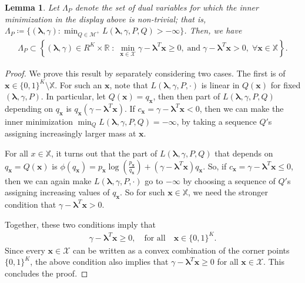 \documentclass{article}
\theoremstyle{plain}
\newtheorem{lemma}[lemma]{Lemma}
\theoremstyle{definition}
\newcommand{\lrp}[1]{\left( #1 \right)}
\newcommand{\R}{\mathbb{R}}
\newcommand{\calX}{\mathcal X}
\newcommand{\calM}{\mathcal M}
\newcommand{\xvec}{\mathbf{x}}
\newcommand{\qtext}[1]{\quad \text{#1} \quad}
\newcommand{\boldlambda}{\boldsymbol{\lambda}}
\newcommand{\finitesupport}{\mathbb{X}}
\begin{document}
\begin{lemma}
    \label{lemma:finite-dual-support}
    Let $\Lambda_P$ denote the set of dual variables for which the inner minimization in the display above is non-trivial; that is, $\Lambda_P \coloneqq \{(\boldlambda, \gamma): \min_{Q \in \calM^+} L(\boldlambda, \gamma, P, Q) > -\infty\}$. Then, we have 
\begin{align}
    \Lambda_P \subset \left\{ (\boldlambda, \gamma) \in R^K \times \R \;:\;  \min_{\xvec \in \calX}   \gamma -  \boldlambda^T \xvec \geq 0,  \;\text{and}\; \gamma - \boldlambda^T \xvec >0, \;\forall \xvec \in \finitesupport  \right\}. \label{eq:dual-feasible-1}
\end{align}
\end{lemma}

\begin{proof}
We prove this result by separately considering two cases. The first is of $\xvec \in \{0,1\}^K \setminus \finitesupport$. For such an $\xvec$, note that $L(\boldlambda, \gamma, P, \cdot)$ is linear in $Q(\xvec)$ for  fixed $(\boldlambda, \gamma, P)$.  In particular, let $Q(\xvec) = q_\xvec$, then then part of $L(\boldlambda, \gamma, P, Q)$ depending on $q_\xvec$ is $q_\xvec(\gamma - \boldlambda^T \xvec)$. If $c_\xvec = \gamma - \boldlambda^T \xvec < 0$, then we can make the inner minimization $\min_{Q} L(\boldlambda, \gamma, P, Q) = -\infty$, by taking a sequence $Q'$s assigning increasingly larger mass at $\xvec$. 

For all $x\in \finitesupport$, it turns out that the part of $L(\boldlambda, \gamma, P, Q)$ that depends on $q_\xvec = Q(\xvec)$ is $\phi(q_\xvec) = p_\xvec \log \lrp{ \tfrac{p_\xvec}{q_\xvec} } + (\gamma - \boldlambda^T \xvec) q_\xvec$. So, if $c_\xvec = \gamma - \boldlambda^T \xvec \leq 0$, then we can again make $L(\boldlambda, \gamma, P, \cdot)$ go to $-\infty$ by choosing a sequence of $Q'$s assigning increasing values of $q_\xvec$. So for such $\xvec \in \finitesupport$, we need the stronger condition that $\gamma - \boldlambda^T \xvec > 0$. 

Together, these two conditions imply that 
\begin{align}
    \gamma - \boldlambda^T \xvec \geq 0, \qtext{for all} \xvec \in \{0,1\}^K. 
\end{align}
Since every $\xvec \in \calX$ can be written as a convex combination of the corner points $\{0,1\}^K$, the above condition also implies that $\gamma - \boldlambda^T \xvec \geq 0$ for all $\xvec \in \calX$. This concludes the proof. 
\end{proof}
\end{document}
